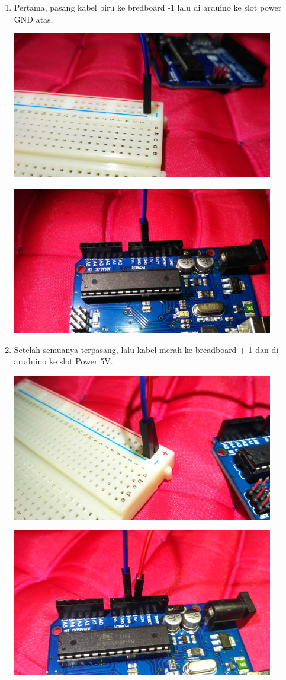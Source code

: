 \begin{enumerate}
	
	\item  Pertama, pasang kabel biru ke bredboard -1 lalu di arduino ke slot power GND atas.
	\break
	\centerline{\includegraphics[width=0.9\textwidth]{figures/1.jpg}}
	\break
	\centerline{\includegraphics[width=0.9\textwidth]{figures/2.jpg}}
	\break
	\item Setelah semuanya terpasang, lalu kabel merah ke breadboard + 1 dan di aruduino ke slot Power 5V.
	\break
	\centerline{\includegraphics[width=0.9\textwidth]{figures/3.jpg}}
	\break
	\centerline{\includegraphics[width=0.9\textwidth]{figures/4.jpg}}

\end{enumerate}
